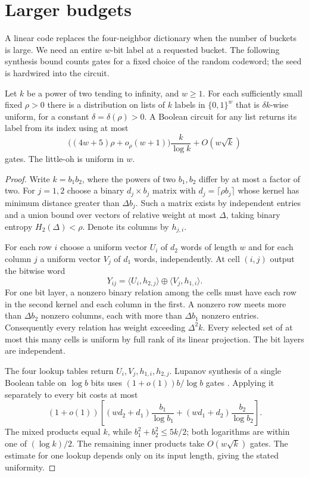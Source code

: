 \documentclass[11pt]{article}
\begin{document}
\section{Larger budgets}\label{large}
A linear code replaces the four-neighbor dictionary when the number of buckets is large. We need an entire $w$-bit label at a requested bucket. The following synthesis bound counts gates for a fixed choice of the random codeword; the seed is hardwired into the circuit.
\begin{lemma}\label{word}
Let $k$ be a power of two tending to infinity, and $w\ge1$. For each sufficiently small fixed $\rho>0$ there is a distribution on lists of $k$ labels in $\{0,1\}^w$ that is $\delta k$-wise uniform, for a constant $\delta=\delta(\rho)>0$. A Boolean circuit for any list returns its label from its index using at most
\[
 \big((4w+5)\rho+o_\rho(w+1)\big)\frac{k}{\log k}+O(w\sqrt k)
\]
gates. The little-oh is uniform in $w$.
\end{lemma}
\begin{proof}
Write $k=b_1b_2$, where the powers of two $b_1,b_2$ differ by at most a factor of two. For $j=1,2$ choose a binary $d_j\times b_j$ matrix with $d_j=\lceil\rho b_j\rceil$ whose kernel has minimum distance greater than $\Delta b_j$. Such a matrix exists by independent entries and a union bound over vectors of relative weight at most $\Delta$, taking binary entropy $H_2(\Delta)<\rho$. Denote its columns by $h_{j,i}$.

For each row $i$ choose a uniform vector $U_i$ of $d_2$ words of length $w$ and for each column $j$ a uniform vector $V_j$ of $d_1$ words, independently. At cell $(i,j)$ output the bitwise word
\[
 Y_{ij}=\langle U_i,h_{2,j}\rangle\oplus\langle V_j,h_{1,i}\rangle.
\]
For one bit layer, a nonzero binary relation among the cells must have each row in the second kernel and each column in the first. A nonzero row meets more than $\Delta b_2$ nonzero columns, each with more than $\Delta b_1$ nonzero entries. Consequently every relation has weight exceeding $\Delta^2 k$. Every selected set of at most this many cells is uniform by full rank of its linear projection. The bit layers are independent.

The four lookup tables return $U_i,V_j,h_{1,i},h_{2,j}$. Lupanov synthesis of a single Boolean table on $\log b$ bits uses $(1+o(1))b/\log b$ gates \cite{lupanov}. Applying it separately to every bit costs at most
\[
 (1+o(1))\left[(w d_2+d_1)\frac{b_1}{\log b_1}
 +(w d_1+d_2)\frac{b_2}{\log b_2}\right].
\]
The mixed products equal $k$, while $b_1^2+b_2^2\le5k/2$; both logarithms are within one of $(\log k)/2$. The remaining inner products take $O(w\sqrt k)$ gates. The estimate for one lookup depends only on its input length, giving the stated uniformity.
\end{proof}
\end{document}

